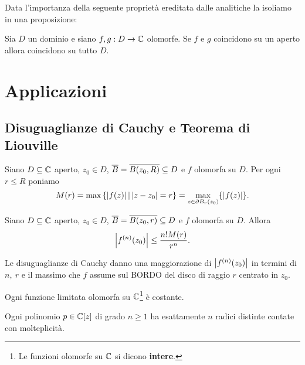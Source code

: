 \begin{multicols*}{2}
\noindent Data l'importanza della seguente propriet\`a ereditata dalle analitiche la isoliamo in una proposizione:
\begin{proposition}\label{PrincipioDiIdentita}
Sia $D$ un dominio e siano $f,g:D\to \mathbb{C}$ olomorfe. Se $f$ e $g$ coincidono su un aperto allora coincidono su tutto $D$.
\end{proposition}

\section{Applicazioni}
\subsection{Disuguaglianze di Cauchy e Teorema di Liouville}
\begin{notation}
Siano $D\subseteq \mathbb{C}$ aperto, $z_0\in D$, $\overline{B}=\overline{B(z_0,R)}\subseteq D$ e $f$ olomorfa su $D$. Per ogni $r\leq R$ poniamo
\[M(r)=\max\left\{|f(z)|\,\middle|\, \left|z-z_0\right|=r\right\}=\max_{z\in \partial B_r(z_0)}\{|f(z)|\}.\]
\end{notation}
\begin{proposition}\label{DisuguaglianzeCauchy}
Siano $D\subseteq \mathbb{C}$ aperto, $z_0\in D$, $\overline{B}=\overline{B(z_0,r)}\subseteq D$ e $f$ olomorfa su $D$.
Allora
\[\left|f^{(n)}(z_0)\right|\leq \frac{n!M(r)}{r^n}.\]
\end{proposition}
\begin{remark}
Le disuguaglianze di Cauchy danno una maggiorazione di $\left|f^{(n)}(z_0)\right|$ in termini di $n,\ r$ e il massimo che $f$ assume sul BORDO del disco di raggio $r$ centrato in $z_0$.
\end{remark}

\begin{corollary}\label{TeoremaLiouville}
Ogni funzione limitata olomorfa su $\mathbb{C}$\footnote{Le funzioni olomorfe su $\mathbb{C}$ si dicono \textbf{intere}.} \`e costante.
\end{corollary}

\begin{corollary}\label{TeoremaFondamentaleAlgebra}
Ogni polinomio $p\in\mathbb{C}[z]$ di grado $n\geq 1$ ha esattamente $n$ radici distinte contate con molteplicit\`a.
\end{corollary}


\end{multicols*}
